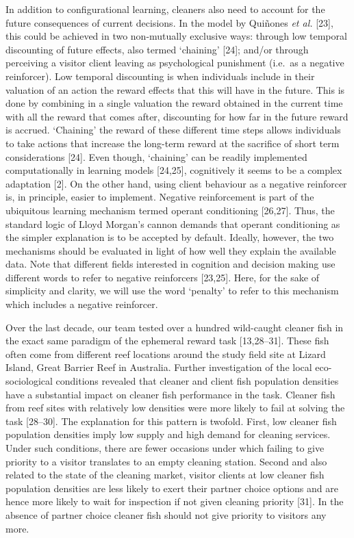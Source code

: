 \documentclass[10pt,letterpaper]{article}
\begin{document}
In addition to configurational learning, cleaners also need to account
for the future consequences of current decisions. In the model by
Quiñones \emph{et al.} {[}23{]}, this could be achieved in two
non-mutually exclusive ways: through low temporal discounting of future
effects, also termed `chaining' {[}24{]}; and/or through perceiving a
visitor client leaving as psychological punishment (i.e.~as a negative
reinforcer). Low temporal discounting is when individuals include in
their valuation of an action the reward effects that this will have in
the future. This is done by combining in a single valuation the reward
obtained in the current time with all the reward that comes after,
discounting for how far in the future reward is accrued. `Chaining' the
reward of these different time steps allows individuals to take actions
that increase the long-term reward at the sacrifice of short term
considerations {[}24{]}. Even though, `chaining' can be readily
implemented computationally in learning models {[}24,25{]}, cognitively
it seems to be a complex adaptation {[}2{]}. On the other hand, using
client behaviour as a negative reinforcer is, in principle, easier to
implement. Negative reinforcement is part of the ubiquitous learning
mechanism termed operant conditioning {[}26,27{]}. Thus, the standard
logic of Lloyd Morgan's cannon demands that operant conditioning as the
simpler explanation is to be accepted by default. Ideally, however, the
two mechanisms should be evaluated in light of how well they explain the
available data. Note that different fields interested in cognition and
decision making use different words to refer to negative reinforcers
{[}23,25{]}. Here, for the sake of simplicity and clarity, we will use
the word `penalty' to refer to this mechanism which includes a negative
reinforcer.

Over the last decade, our team tested over a hundred wild-caught cleaner
fish in the exact same paradigm of the ephemeral reward task
{[}13,28--31{]}. These fish often come from different reef locations
around the study field site at Lizard Island, Great Barrier Reef in
Australia. Further investigation of the local eco-sociological
conditions revealed that cleaner and client fish population densities
have a substantial impact on cleaner fish performance in the task.
Cleaner fish from reef sites with relatively low densities were more
likely to fail at solving the task {[}28--30{]}. The explanation for
this pattern is twofold. First, low cleaner fish population densities
imply low supply and high demand for cleaning services. Under such
conditions, there are fewer occasions under which failing to give
priority to a visitor translates to an empty cleaning station. Second
and also related to the state of the cleaning market, visitor clients at
low cleaner fish population densities are less likely to exert their
partner choice options and are hence more likely to wait for inspection
if not given cleaning priority {[}31{]}. In the absence of partner
choice cleaner fish should not give priority to visitors any more.
\end{document}
